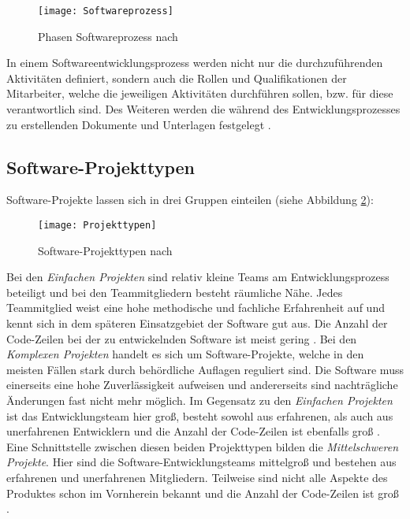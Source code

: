 \begin{figure}[htp]
\begin{center} 
  \texttt{[image: Softwareprozess]} %
  \caption{Phasen Softwareprozess nach \cite{Hanser2010}}
  \label{fig:SEProzess}
\end{center}
\end{figure}

In einem Softwareentwicklungsprozess werden nicht nur die durchzuführenden Aktivitäten definiert, sondern auch die Rollen und Qualifikationen der Mitarbeiter, welche die jeweiligen Aktivitäten durchführen sollen, bzw. für diese verantwortlich sind. Des Weiteren werden die während des Entwicklungsprozesses zu erstellenden Dokumente und Unterlagen festgelegt \cite{Hanser2010}.

\subsection{Software-Projekttypen}

Software-Projekte lassen sich in drei Gruppen einteilen (siehe Abbildung \ref{fig:Projekttypen}):
\begin{figure}[htp]
\begin{center}
  \texttt{[image: Projekttypen]} %
  \caption{Software-Projekttypen nach \cite{Boehm81}}
  \label{fig:Projekttypen}
\end{center}
\end{figure}
Bei den \textit{Einfachen Projekten} sind relativ kleine Teams am Entwicklungsprozess beteiligt und bei den Teammitgliedern besteht räumliche Nähe. Jedes Teammitglied weist eine hohe methodische und fachliche Erfahrenheit auf und kennt sich in dem späteren Einsatzgebiet der Software gut aus. Die Anzahl der Code-Zeilen bei der zu entwickelnden Software ist meist gering \cite{Boehm81, Hanser2010}. \newline
Bei den \textit{Komplexen Projekten} handelt es sich um Software-Projekte, welche in den meisten Fällen stark durch behördliche Auflagen reguliert sind. Die Software muss einerseits eine hohe Zuverlässigkeit aufweisen und andererseits sind nachträgliche Änderungen fast nicht mehr möglich. Im Gegensatz zu den \textit{Einfachen Projekten} ist das Entwicklungsteam hier groß, besteht sowohl aus erfahrenen, als auch aus unerfahrenen Entwicklern und die Anzahl der Code-Zeilen ist ebenfalls groß \cite{Boehm81, Hanser2010}. \newline
Eine Schnittstelle zwischen diesen beiden Projekttypen bilden die \textit{Mittelschweren Projekte}. Hier sind die Software-Entwicklungsteams mittelgroß und bestehen aus erfahrenen und unerfahrenen Mitgliedern. Teilweise sind nicht alle Aspekte des Produktes schon im Vornherein bekannt und die Anzahl der Code-Zeilen ist groß \cite{Boehm81, Hanser2010}.

